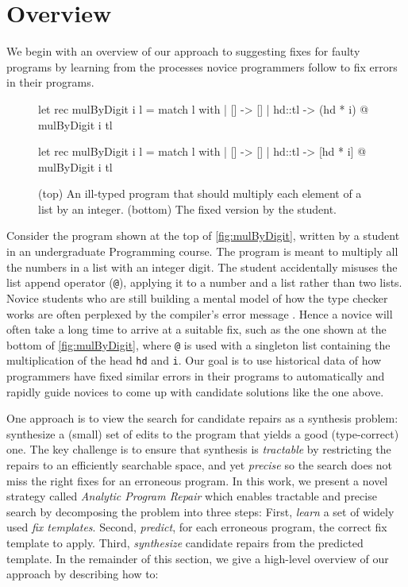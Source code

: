 \section{Overview}
\label{sec:overview}

We begin with an overview of our approach to suggesting fixes for faulty
programs by learning from the processes novice programmers follow
to fix errors in their programs.

\begin{figure}[ht]
\begin{ecode}
let rec mulByDigit i l =
  match l with
  | []     -> []
  | hd::tl -> (hd * i) @ mulByDigit i tl
\end{ecode}

\begin{ecode}
let rec mulByDigit i l =
  match l with
  | []     -> []
  | hd::tl -> [hd * i] @ mulByDigit i tl
\end{ecode}
\caption{(top) An ill-typed \ocaml program that should multiply each element
of a list by an integer. (bottom) The fixed version by the student.}
\label{fig:mulByDigit}
\end{figure}


 Consider the program \mbd shown at the top of
\autoref{fig:mulByDigit}, written by a student in an undergraduate Programming
course. The program is meant to multiply all the numbers in a list with an
integer digit. The student accidentally misuses the list append operator
(\texttt{@}), applying it to a number and a list rather than two lists.
%
Novice students who are still building a mental model of how the type checker
works are often perplexed by the compiler's error message \citep{Munson_2016}.
Hence a novice will often take a long time to arrive at a suitable fix, such as
the one shown at the bottom of \autoref{fig:mulByDigit}, where \texttt{@} is
used with a singleton list containing the multiplication of the head \texttt{hd}
and \texttt{i}.
%
Our goal is to use historical data of how programmers have fixed similar errors
in their programs to automatically and rapidly guide novices to come up with
candidate solutions like the one above.


%
One approach is to view the search for candidate repairs
as a synthesis problem: synthesize a (small) set of edits
to the program that yields a good (\eg type-correct) one.
%
The key challenge is to ensure that synthesis is \emph{tractable}
by restricting the repairs to an efficiently searchable space, and
yet \emph{precise} so the search does not miss the right fixes
for an erroneous program.
%
In this work, we present a novel strategy called
\emph{Analytic Program Repair} which enables tractable
and precise search by decomposing the problem into three steps:
%
First, \emph{learn} a set of widely used \emph{fix templates}.
%
Second, \emph{predict}, for each erroneous program, the correct fix template to apply.
%
Third, \emph{synthesize} candidate repairs from the predicted template.
%
In the remainder of this section, we give a high-level overview
of our approach by describing how to:

